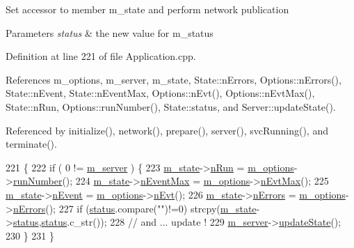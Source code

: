 Set accessor to member m\+\_\+state and perform network publication 
\begin{DoxyParams}{Parameters}
{\em status} & the new value for m\+\_\+status \\
\hline
\end{DoxyParams}


Definition at line 221 of file Application.\+cpp.



References m\+\_\+options, m\+\_\+server, m\+\_\+state, State\+::n\+Errors, Options\+::n\+Errors(), State\+::n\+Event, State\+::n\+Event\+Max, Options\+::n\+Evt(), Options\+::n\+Evt\+Max(), State\+::n\+Run, Options\+::run\+Number(), State\+::status, and Server\+::update\+State().



Referenced by initialize(), network(), prepare(), server(), svc\+Running(), and terminate().


\begin{DoxyCode}
221                                             \{
222   \textcolor{keywordflow}{if} ( 0 != \hyperlink{classApplication_a5e6085b0f322d5036177b16113a75b56}{m\_server} ) \{
223     \hyperlink{classApplication_a0ef9832e2d286716e597a1ff21ffcab4}{m\_state}->\hyperlink{classState_aa29a124a8d6060a02bd2468480d7bbd3}{nRun}      = \hyperlink{classApplication_a3b0c74bf1ba99a5042990e3fefaa8963}{m\_options}->\hyperlink{classOptions_a2d9447919fe90f9ce8df5530526cbb27}{runNumber}();
224     \hyperlink{classApplication_a0ef9832e2d286716e597a1ff21ffcab4}{m\_state}->\hyperlink{classState_ac57f536cfe9e9819dfc891ed00dabfe3}{nEventMax} = \hyperlink{classApplication_a3b0c74bf1ba99a5042990e3fefaa8963}{m\_options}->\hyperlink{classOptions_ad1f3b03d734c806a2feca418b26bcc9b}{nEvtMax}();
225     \hyperlink{classApplication_a0ef9832e2d286716e597a1ff21ffcab4}{m\_state}->\hyperlink{classState_af9d335bba28d6946043a07b047556690}{nEvent}    = \hyperlink{classApplication_a3b0c74bf1ba99a5042990e3fefaa8963}{m\_options}->\hyperlink{classOptions_ad769b256263a4ac24dd6f989ae724ab7}{nEvt}();
226     \hyperlink{classApplication_a0ef9832e2d286716e597a1ff21ffcab4}{m\_state}->\hyperlink{classState_a0dc7f2525107b9b294f50c23da27cc2a}{nErrors}   = \hyperlink{classApplication_a3b0c74bf1ba99a5042990e3fefaa8963}{m\_options}->\hyperlink{classOptions_acc6474323f0bbe17fa844e9a086b90b8}{nErrors}();
227     \textcolor{keywordflow}{if} (\hyperlink{classApplication_ad429c4d2322f706e3564c1ee05d38ff1}{status}.compare(\textcolor{stringliteral}{""})!=0) strcpy(\hyperlink{classApplication_a0ef9832e2d286716e597a1ff21ffcab4}{m\_state}->\hyperlink{classState_aaec062c78d5602d066a7960a2e08e1cd}{status},\hyperlink{classApplication_ad429c4d2322f706e3564c1ee05d38ff1}{status}.c\_str());
228     \textcolor{comment}{// and ... update !}
229     \hyperlink{classApplication_a5e6085b0f322d5036177b16113a75b56}{m\_server}->\hyperlink{classServer_abaa0b878f4f96454339f1989ec12cc6b}{updateState}();
230   \}
231 \}
\end{DoxyCode}
\mbox{\label{classObject_a89557dbbad5bcaa02652f5d7fa35d20f}} 

